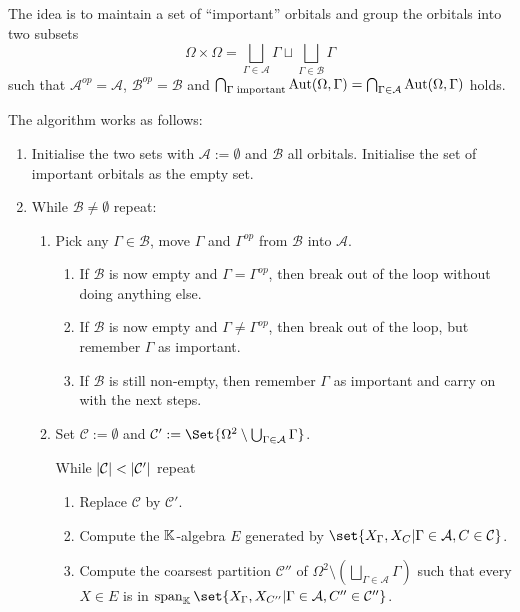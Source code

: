 \documentclass[fontsize=11pt,fleqn,a4paper]{scrartcl}
\begin{document}
\begin{algorithm}
The idea is to maintain a set of \enquote{important} orbitals and group the orbitals into two subsets
\[\Omega\times\Omega = \bigsqcup_{\Gamma\in\mathcal{A}} \Gamma \sqcup \bigsqcup_{\Gamma\in\mathcal{B}} \Gamma\]
such that $\mathcal{A}^{op}=\mathcal{A}$, $\mathcal{B}^{op}=\mathcal{B}$ and $\bigcap_{\Gamma\;\text{important}} \operatorname{Aut}(\Omega,\Gamma) = \bigcap_{\Gamma\in\mathcal{A}} \operatorname{Aut}(\Omega,\Gamma)$ holds.

\medbreak
The algorithm works as follows:
\begin{enumerate}[label=\arabic*.)]
\item Initialise the two sets with $\mathcal{A}:=\emptyset$ and $\mathcal{B}$ all orbitals. Initialise the set of important orbitals as the empty set.

\item While $\mathcal{B}\neq\emptyset$ repeat:
\begin{enumerate}[label=\roman*.)]
\item Pick any $\Gamma\in\mathcal{B}$, move $\Gamma$ and $\Gamma^{op}$ from $\mathcal{B}$ into $\mathcal{A}$.

	\begin{enumerate}[label=\alph*.)]
	\item If $\mathcal{B}$ is now empty and $\Gamma=\Gamma^{op}$, then break out of the loop without doing anything else.
	\item If $\mathcal{B}$ is now empty and $\Gamma\neq\Gamma^{op}$, then break out of the loop, but remember $\Gamma$ as important.
	\item If $\mathcal{B}$ is still non-empty, then remember $\Gamma$ as important and carry on with the next steps.
	\end{enumerate} 

\item Set $\mathcal{C} := \emptyset$ and $\mathcal{C}' := \Set{\Omega^2 \setminus \bigcup_{\Gamma\in\mathcal{A}} \Gamma}$.

While $\lvert\mathcal{C}\rvert<\lvert\mathcal{C}'\rvert$ repeat
	\begin{enumerate}[label=\alph*.)]
	\item Replace $\mathcal{C}$ by $\mathcal{C}'$.
	\item Compute the $\mathbb{K}$-algebra $E$ generated by $\set{X_{\Gamma}, X_C | \Gamma\in\mathcal{A}, C\in\mathcal{C}}$.
	
	\item Compute the coarsest partition $\mathcal{C}''$ of $\Omega^2 \setminus \left(\bigsqcup_{\Gamma\in\mathcal{A}} \Gamma\right)$ such that every $X\in E$ is in $\LinHull_\IK\set{X_{\Gamma}, X_{C''} | \Gamma\in\mathcal{A}, C''\in\mathcal{C}''}$.
	

\end{enumerate}
\end{enumerate}
\end{enumerate}
\end{algorithm}
\end{document}
